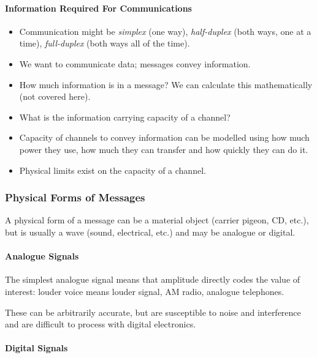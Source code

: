\paragraph{Information Required For Communications}\label{par:information_required_for_communications}

\begin{itemize}
	\item Communication might be \emph{simplex} (one way), \emph{half-duplex} (both ways, one at a time), \emph{full-duplex} (both ways all of the time).
	\item We want to communicate data; messages convey information.
	\item How much information is in a message? We can calculate this mathematically (not covered here).
	\item What is the information carrying capacity of a channel?
	\item Capacity of channels to convey information can be modelled using how much power they use, how much they can transfer and how quickly they can do it.
	\item Physical limits exist on the capacity of a channel.
\end{itemize}

\subsubsection{Physical Forms of Messages}\label{ssub:physical_forms_of_messages}

A physical form of a message can be a material object (carrier pigeon, CD, etc.), but is usually a wave (sound, electrical, etc.) and may be analogue or digital.

\paragraph{Analogue Signals}\label{par:analogue_signals}

The simplest analogue signal means that amplitude directly codes the value of interest: louder voice means louder signal, AM radio, analogue telephones.

These can be arbitrarily accurate, but are susceptible to noise and interference and are difficult to process with digital electronics.

\paragraph{Digital Signals}\label{par:digital_signals}

